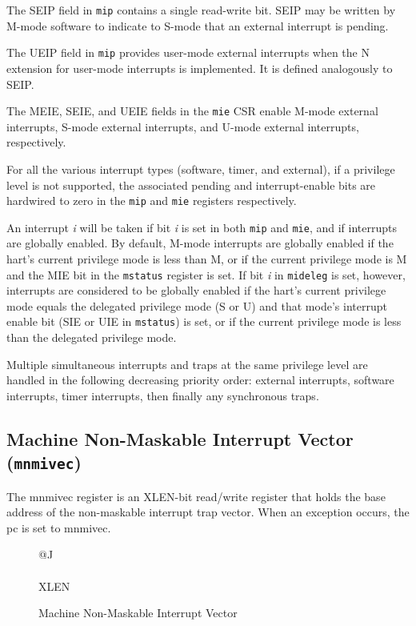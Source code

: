The SEIP field in \texttt{mip} contains a single read-write bit.  SEIP
may be written by M-mode software to indicate to S-mode that an
external interrupt is pending.


The UEIP field in \texttt{mip} provides user-mode external interrupts when the
N extension for user-mode interrupts is implemented.  It is defined
analogously to SEIP.

The MEIE, SEIE, and UEIE fields in the \texttt{mie} CSR enable M-mode external
interrupts, S-mode external interrupts, and U-mode external interrupts,
respectively.

For all the various interrupt types (software, timer, and external),
if a privilege level is not supported, the associated pending and
interrupt-enable bits are hardwired to zero in the \texttt{mip} and \texttt{mie} registers respectively.

An interrupt \emph{i} will be taken if bit \emph{i} is set in both \texttt{mip} and \texttt{mie}, and if interrupts are globally enabled.  By
default, M-mode interrupts are globally enabled if the hart's current
privilege mode is less than M, or if the current privilege mode is M
and the MIE bit in the \texttt{mstatus} register is set.  If bit \emph{i}
in \texttt{mideleg} is set, however, interrupts are considered to be
globally enabled if the hart's current privilege mode equals the
delegated privilege mode (S or U) and that mode's interrupt enable
bit (SIE or UIE in \texttt{mstatus}) is set, or if the current
privilege mode is less than the delegated privilege mode.

Multiple simultaneous interrupts and traps at the same privilege level
are handled in the following decreasing priority order: external
interrupts, software interrupts, timer interrupts, then finally any
synchronous traps.

\subsection{Machine Non-Maskable Interrupt Vector
(\texttt{mnmivec})}\label{machine-non-maskable-interrupt-vector-mnmivec}

The mnmivec register is an XLEN-bit read/write register that holds the
base address of the non-maskable interrupt trap vector. When an
exception occurs, the pc is set to mnmivec.

\ifdefined\MARKDOWN
\else

\begin{figure}[htb]
	{\footnotesize
		\begin{center}
			\begin{tabular}{@{}J}
				 \\
				\hline
				 \\
				\hline
				XLEN \\
			\end{tabular}
		\end{center}
	}
	\vspace{-0.1in}
	\caption{Machine Non-Maskable Interrupt Vector}
	\label{fig:mnmivecreg}
\end{figure}

